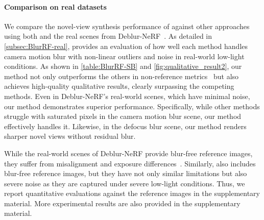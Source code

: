 \paragraph{Comparison on real datasets}
We compare the novel-view synthesis performance of \MethodName{} against other approaches using both \RealDataName{} and the real scenes from Deblur-NeRF~\cite{ma2022deblurnerf}.
As detailed in \cref{subsec:BlurRF-real}, \RealDataName{} provides an evaluation of how well each method handles camera motion blur with non-linear outliers and noise in real-world low-light conditions.
As shown in \cref{table:BlurRF-SB} and \cref{fig:qualitative_result2}, our method not only outperforms the others in non-reference metrics~\cite{mittal2012completelyblind, agnolucci2024arniqa} but also achieves high-quality qualitative results, clearly surpassing the competing methods.
Even in Deblur-NeRF's real-world scenes, which have minimal noise, our method demonstrates superior performance.
Specifically, while other methods struggle with saturated pixels in the camera motion blur scene, our method effectively handles it.
Likewise, in the defocus blur scene, our method renders sharper novel views without residual blur.

While the real-world scenes of Deblur-NeRF provide blur-free reference images, they suffer from misalignment and exposure differences~\cite{ma2022deblurnerf, peng2023pdrf, peng2024bags}.
Similarly, \RealDataName{} also includes blur-free reference images, but they have not only similar limitations but also severe noise as they are captured under severe low-light conditions.
Thus, we report quantitative evaluations against the reference images in the supplementary material.
More experimental results are also provided in the supplementary material.



